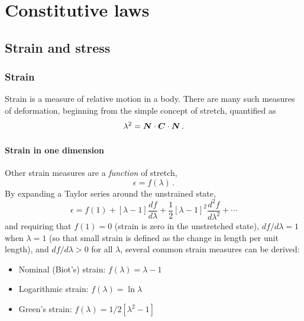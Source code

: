 \documentclass[10pt,letterpaper,oneside]{report}
\newcommand{\ten}[1]{\mbox{\boldmath $#1$}{}}
\begin{document}
\chapter{Constitutive laws}
\label{chap:const}

\section{Strain and stress}

\subsection{Strain}
Strain is a measure of relative motion in a body.  There are many such measures of deformation, beginning from the simple concept of stretch, quantified as
\begin{equation}
\lambda^2 = \ten{N} \cdot \ten{C} \cdot \ten{N} \, .
\end{equation}

\subsubsection{Strain in one dimension}
Other strain measures are a \emph{function} of stretch, 
\begin{equation}
\epsilon = f \left( \lambda \right) \, .
\end{equation}
By expanding a Taylor series around the unstrained state, 
\begin{equation}
\epsilon = f \left( 1 \right) + \left[ \lambda - 1 \right] \frac{d f}{d \lambda} + \frac{1}{2} \left[ \lambda - 1 \right]^2 \frac{d^2 f}{d \lambda^2} + \cdots
\end{equation}
and requiring that $f \left( 1 \right) = 0$ (strain is zero in the unstretched state), $d f / d \lambda = 1$ when $\lambda = 1$ (so that small strain is defined as the change in length per unit length), and $d f / d \lambda > 0$ for all $\lambda$, several common strain measures can be derived:
\begin{itemize}
\item Nominal (Biot's) strain: $ f \left( \lambda \right) = \lambda - 1$
\item Logarithmic strain: $ f \left( \lambda \right) = \ln \lambda$ 
\item Green's strain: $ f \left( \lambda \right) = 1 / 2 \left[ \lambda^2 - 1 \right]$
\end{itemize}
\end{document}

